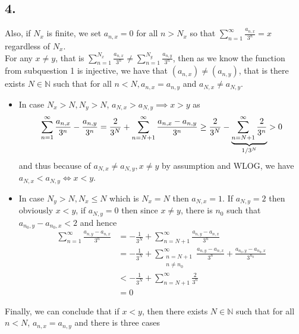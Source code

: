 \documentclass[11pt]{article}
\theoremstyle{mystyle}
\theoremstyle{definition}
\begin{document}
\subsection*{4.}
Also, if $N_x$ is finite, we set $a_{n, x} = 0$ for all $n>N_x$ so that $\sum_{n=1}^\infty \frac{a_{n,x}}{3^n} = x$ regardless of $N_x$. \\   
For any $x \ne y$, that is $\sum_{n=1}^{N_x} \frac{a_{n,x}}{3^n} \ne  \sum_{n=1}^{N_y} \frac{a_{n,y}}{3^n}$, then as we know the function from subquestion 1 is injective, we have that $(a_{n,x}) \ne (a_{n,y})$, that is there exists $N \in \mathbb{N}$ such that for all $n<N, a_{n,x} = a_{n,y}$ and $a_{N,x} \ne a_{N,y}$. 
\begin{itemize}
  \item In case $N_x > N, N_y > N$, $a_{N,x} > a_{N,y} \implies x>y$ as \\
    \[
      \sum_{n=1}^{\infty} \frac{a_{n,x}}{3^n} - \frac{a_{n,y}}{3^n} 
      = \frac{2}{3^N} + \sum_{n=N+1}^\infty \frac{a_{n,x} - a_{n,y}}{3^n} \\
      \ge \frac{2}{3^N} - \underbrace{\sum_{n=N+1}^\infty \frac{2}{3^n}}_{1/3^N} 
      > 0
    \]
    and thus because of $a_{N,x} \ne a_{N,y}, x \ne y$ by assumption and WLOG, we have $a_{N,x} < a_{N,y} \iff x < y$. 
  \item In case $N_y > N, N_x \le N$ which is $N_x = N$ then $a_{N,x} = 1$. If $a_{N,y} = 2$ then obviously $x<y$, if $a_{N,y} = 0$ then since $x \ne y$, there is $n_0$ such that $a_{n_0,y} - a_{n_0,x} < 2$ and hence 
    \begin{align*}
       \sum_{n=1}^\infty \frac{a_{n,y} - a_{n,x}}{3^n} 
       &= -\frac{1}{3^N} + \sum_{n=N+1}^\infty \frac{a_{n,y}- a_{n,x}}{3^n} \\ 
       &= -\frac{1}{3^N} + \sum_{\substack{n=N+1 \\ n\ne n_0}}^\infty \frac{a_{n,y} - a_{n,x}}{3^n} + \frac{a_{n_0,y} - a_{n_0,x}}{3^{n_0}} \\
       &<   -\frac{1}{3^N} + \sum_{n=N+1}^\infty \frac{2}{3^n} \\ 
       &= 0
    \end{align*}
\end{itemize}
Finally, we can conclude that if $x<y$, then there exists $N \in \mathbb{N}$ such that for all $n<N$, $a_{n,x} = a_{n,y}$ and there is three cases 
\end{document}
